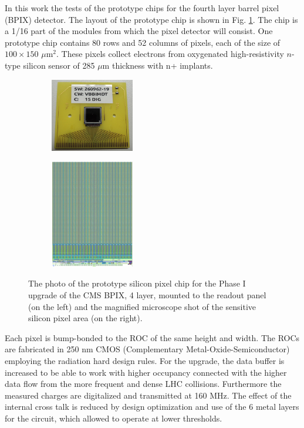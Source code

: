 In this work the tests of the prototype chips for the fourth layer barrel pixel (BPIX) detector. The layout of the prototype chip is shown 
in Fig. \ref{fig:prototype}. The chip is a 1/16 part of the modules from which the pixel detector will consist. 
One prototype chip contains 80 rows and 52 columns of pixels, each of the size of $100\times150$ $\mu$m$^{2}$.
These pixels collect electrons from oxygenated high-resistivity $n$-type silicon sensor of 285 $\mu$m thickness with n+ implants. 

\begin{figure}[t]
 \centering
 \begin{subfigure}
  \centering
  \includegraphics[width=0.4\textwidth]{021_pixel_upgrade/plots/prototype_chip_photo.png}
 \end{subfigure}
 \begin{subfigure}
  \centering
  \includegraphics[width=0.4\textwidth]{021_pixel_upgrade/plots/prototype_chip.png}
 \end{subfigure}
 \caption{The photo of the prototype silicon pixel chip for the Phase I upgrade of the CMS BPIX, 4 layer, mounted to the readout panel (on the left)
 and the magnified microscope shot of the sensitive silicon pixel area (on the right).}
 \label{fig:prototype}
\end{figure}

Each pixel is bump-bonded to the ROC of the same height and width. The ROCs are fabricated in 250 nm CMOS (Complementary Metal-Oxide-Semiconductor)
employing the radiation hard design rules.
For the upgrade, the data buffer is increased to be able to work with higher occupancy connected with the higher data flow from the more frequent 
and dense LHC collisions. Furthermore the measured charges are digitalized and transmitted at 160 MHz. The effect of the internal cross talk is reduced
by design optimization and use of the 6 metal layers for the circuit, which allowed to operate at lower thresholds.

